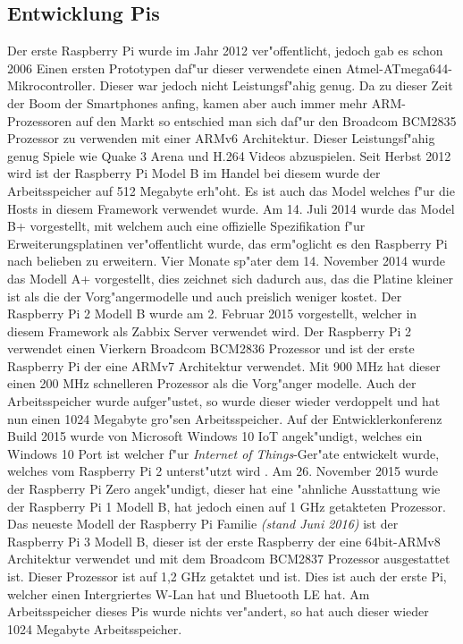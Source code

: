 \subsection{Entwicklung Pis}
Der erste Raspberry Pi wurde im Jahr 2012 ver"offentlicht, jedoch gab es schon 2006 Einen ersten Prototypen daf"ur %
dieser verwendete einen Atmel-ATmega644-Mikrocontroller. Dieser war jedoch nicht Leistungsf"ahig genug. %
Da zu dieser Zeit der Boom der Smartphones anfing, kamen aber auch immer mehr ARM-Prozessoren auf den Markt %
so entschied man sich daf"ur den Broadcom BCM2835 Prozessor zu verwenden mit einer ARMv6 Architektur. Dieser Leistungsf"ahig genug %
Spiele wie Quake 3 Arena und H.264 Videos abzuspielen. Seit Herbst 2012 wird ist der Raspberry Pi Model B im Handel %
bei diesem wurde der Arbeitsspeicher auf 512 Megabyte erh"oht. Es ist auch das Model welches f"ur die Hosts in %
diesem Framework verwendet wurde. Am 14. Juli 2014 wurde das Model B+ vorgestellt, mit welchem auch eine %
offizielle Spezifikation f"ur Erweiterungsplatinen ver"offentlicht wurde, das erm"oglicht es den Raspberry Pi %
nach belieben zu erweitern. Vier Monate sp"ater dem 14. November 2014 wurde das Modell A+ vorgestellt, dies %
zeichnet sich dadurch aus, das die Platine kleiner ist als die der Vorg"angermodelle und auch preislich weniger %
kostet. Der Raspberry Pi 2 Modell B wurde am 2. Februar 2015 vorgestellt, welcher in diesem Framework als Zabbix %
Server verwendet wird. Der Raspberry Pi 2 verwendet einen Vierkern Broadcom BCM2836 Prozessor und ist der erste Raspberry Pi %
der eine ARMv7 Architektur verwendet. Mit 900 MHz hat dieser einen 200 MHz schnelleren Prozessor als die Vorg"anger%
modelle. Auch der Arbeitsspeicher wurde aufger"ustet, so wurde dieser wieder verdoppelt und hat nun einen 1024 Megabyte %
gro"sen Arbeitsspeicher. Auf der Entwicklerkonferenz Build 2015 wurde von Microsoft Windows 10 IoT angek"undigt, welches %
ein Windows 10 Port ist welcher f"ur \emph{Internet of Things}-Ger"ate entwickelt wurde, welches vom Raspberry Pi 2 %
unterst"utzt wird \autocite{web:winIoT}. Am 26. November 2015 wurde der Raspberry Pi Zero angek"undigt, dieser hat %
eine "ahnliche Ausstattung wie der Raspberry Pi 1 Modell B, hat jedoch einen auf 1 GHz getakteten Prozessor. %
Das neueste Modell der Raspberry Pi Familie \emph{(stand Juni 2016)} ist der Raspberry Pi 3 Modell B, dieser ist %
der erste Raspberry der eine 64bit-ARMv8 Architektur verwendet und mit dem Broadcom BCM2837 Prozessor ausgestattet ist. %
Dieser Prozessor ist auf 1,2 GHz getaktet und ist. Dies ist auch der erste Pi, welcher einen Intergriertes W-Lan hat und %
Bluetooth LE hat. Am Arbeitsspeicher dieses Pis wurde nichts ver"andert, so hat auch dieser wieder 1024 Megabyte Arbeitsspeicher. %
   


